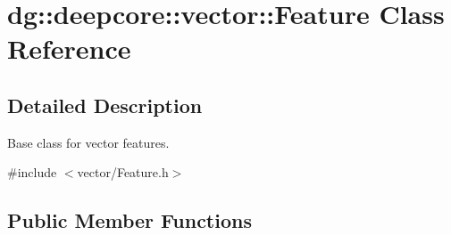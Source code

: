 \hypertarget{classdg_1_1deepcore_1_1vector_1_1_feature}{}\section{dg\+:\+:deepcore\+:\+:vector\+:\+:Feature Class Reference}
\label{classdg_1_1deepcore_1_1vector_1_1_feature}


\subsection{Detailed Description}
Base class for vector features. 

{\ttfamily \#include $<$vector/\+Feature.\+h$>$}

\subsection*{Public Member Functions}
